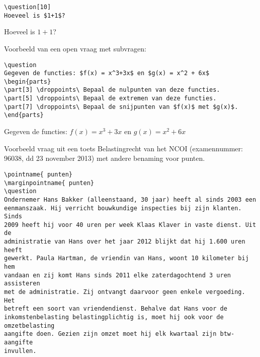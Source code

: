 \documentclass[dutch,a4paper,12pt,addpoints,fleqn,oneside]{tisdexam}
\begin{document}
\begin{questions}
         
\begin{lstlisting}
\question[10]
Hoeveel is $1+1$?
\end{lstlisting}
\question[10]
Hoeveel is $1+1$?


\bigskip\noindent
Voorbeeld van een open vraag met subvragen:

\begin{lstlisting}
\question
Gegeven de functies: $f(x) = x^3+3x$ en $g(x) = x^2 + 6x$
\begin{parts}
\part[3] \droppoints\ Bepaal de nulpunten van deze functies.
\part[5] \droppoints\ Bepaal de extremen van deze functies.
\part[7] \droppoints\ Bepaal de snijpunten van $f(x)$ met $g(x)$.
\end{parts}
\end{lstlisting}
\question
Gegeven de functies: $f(x) = x^3+3x$ en $g(x) = x^2 +6x$

\bigskip
Voorbeeld vraag uit een toets Belastingrecht van het NCOI (examennummer:
96038, dd 23 november 2013) met andere benaming voor
punten.

\begin{lstlisting}
\pointname{ punten}
\marginpointname{ punten}
\question
Ondernemer Hans Bakker (alleenstaand, 30 jaar) heeft al sinds 2003 een
eenmanszaak. Hij verricht bouwkundige inspecties bij zijn klanten. Sinds
2009 heeft hij voor 40 uren per week Klaas Klaver in vaste dienst. Uit de
administratie van Hans over het jaar 2012 blijkt dat hij 1.600 uren heeft
gewerkt. Paula Hartman, de vriendin van Hans, woont 10 kilometer bij hem
vandaan en zij komt Hans sinds 2011 elke zaterdagochtend 3 uren assisteren
met de administratie. Zij ontvangt daarvoor geen enkele vergoeding. Het
betreft een soort van vriendendienst. Behalve dat Hans voor de
inkomstenbelasting belastingplichtig is, moet hij ook voor de omzetbelasting
aangifte doen. Gezien zijn omzet moet hij elk kwartaal zijn btw-aangifte
invullen.


\end{lstlisting}
\end{questions}
\end{document}
